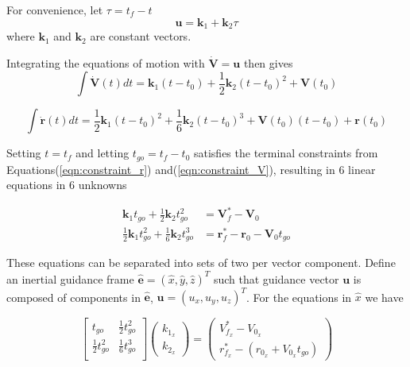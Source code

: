 For convenience, let $\tau = t_f - t$
\begin{equation}
\label{eqn:command}
\bm{u} = \bm{k}_1 + \bm{k}_2 \tau
\end{equation}
where $\bm{k}_1$ and $\bm{k}_2$ are constant vectors.

Integrating the equations of motion with $\bm{\dot{V}} = \bm{u}$ then gives
\begin{equation}
\label{eqn:EoM_solve_1}
\int\bm{\dot{V}}(t) dt  = \bm{k}_1(t-t_0) + \frac{1}{2}\bm{k}_2(t-t_0)^2 + \bm{V}(t_0) 
\end{equation}

\begin{equation}
\int \bm{\dot{r}}(t)dt = \frac{1}{2} \bm{k}_1(t-t_0)^2 + \frac{1}{6}\bm{k}_2(t-t_0)^3 + \bm{V}(t_0)(t-t_0) + \bm{r}(t_0) 
\label{eqn:EoM_solve_2}
\end{equation}

Setting $t = t_f$ and letting $t_{go} = t_f - t_0$ satisfies the terminal constraints from Equations\:(\ref{eqn:constraint_r}) and\:(\ref{eqn:constraint_V}), resulting in 6 linear equations in 6 unknowns

\begin{align}
\label{eqn:system1}
\bm{k}_1 t_{go} + \frac{1}{2}\bm{k}_2 t_{go}^2 &= \bm{V}_f^* - \bm{V}_0\\
\label{eqn:system2}
\frac{1}{2}\bm{k}_1 t_{go}^2 + \frac{1}{6}\bm{k}_2 t_{go}^3 &= \bm{r}_f^* - \bm{r}_0 - \bm{V}_0t_{go}
\end{align}

These equations can be separated into sets of two per vector component. Define an inertial guidance frame $\hat{\bm{e}} = (\hat{x},\hat{y},\hat{z})^T$ such that guidance vector $\bm{u}$ is composed of components in $\hat{\bm{e}}$, $\bm{u} = (u_{x},u_{y},u_{z})^T$. For the equations in $\hat{x}$ we have

\begin{equation}
  \label{eqn:E_system}
  \begin{bmatrix}
    t_{go} & \frac{1}{2}t_{go}^2 \\
    \frac{1}{2}t_{go}^2 & \frac{1}{6}t_{go}^3 \\
  \end{bmatrix}
 \left(
	\begin{matrix}
	k_{1_x} \\ 
	k_{2_x} 
	\end{matrix}
\right) = 
 \left(
	\begin{matrix}
	V_{f_x}^* - V_{0_x} \\ 
	r_{f_x}^* - (r_{0_x} + V_{0_x}t_{go}) 
	\end{matrix}
\right)
\end{equation}

